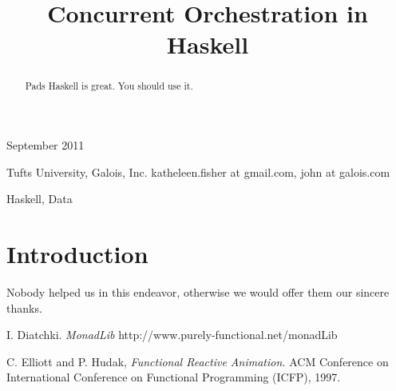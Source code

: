 \documentclass[preprint]{sigplanconf}
\begin{document}
 {September 2011}




\title{Concurrent Orchestration in Haskell}

           {Tufts University, Galois, Inc.}
           {katheleen.fisher at gmail.com, john at galois.com}

\maketitle

\begin{abstract}
Pads Haskell is great. You should use it.
\end{abstract}


\keywords Haskell, Data

\section{Introduction}






\acks

Nobody helped us in this endeavor, otherwise we would offer them our sincere thanks. 





\begin{thebibliography}{}
\softraggedright

 
  I. Diatchki.
  \emph{MonadLib}
  http://www.purely-functional.net/monadLib

  C. Elliott and P. Hudak, 
  \emph{Functional Reactive Animation.}
  ACM Conference on International Conference on Functional Programming (ICFP), 1997.

   
\end{thebibliography}




\end{document}
